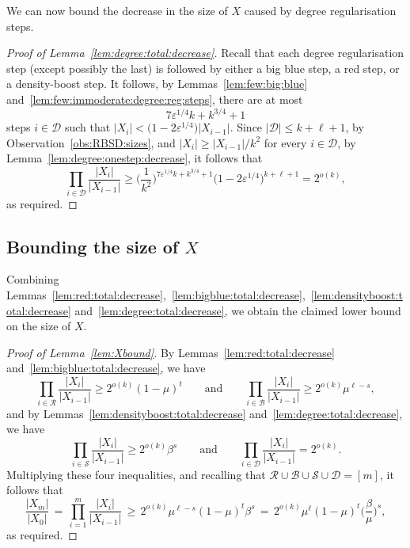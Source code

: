 \documentclass[12pt,reqno]{amsart}
\theoremstyle{definition}
\theoremstyle{remark}
\newcommand\cB{\mathcal{B}}
\def\cS{\mathcal{S}}
\newcommand\eps{\varepsilon}
\renewcommand{\le}{\leqslant}
\renewcommand{\ge}{\geqslant}
\def\eps{\varepsilon}
\def\cD{\mathcal{D}}
\def\cR{\mathcal{R}}
\def\cB{\mathcal{B}}
\begin{document}
We can now bound the decrease in the size of $X$ caused by degree regularisation steps. 

\begin{proof}[Proof of Lemma~\ref{lem:degree:total:decrease}]
Recall that each degree regularisation step (except possibly the last) is followed by either a big blue step, a red step, or a density-boost step. It follows, by Lemmas~\ref{lem:few:big:blue} and~\ref{lem:few:immoderate:degree:reg:steps}, there are at most 
$$7 \eps^{1/4} k + k^{3/4} + 1$$ 
steps $i \in \cD$ such that $|X_i| < \big( 1 - 2 \eps^{1/4} \big) |X_{i-1}|$. Since $|\cD| \le k+\ell+1$, by Observation~\ref{obs:RBSD:sizes}, and $|X_i| \ge |X_{i-1}| / k^2$ for every $i \in \cD$, by Lemma~\ref{lem:degree:onestep:decrease}, it follows that
$$\prod_{i \in \cD} \frac{|X_i|}{|X_{i-1}|} \ge \bigg( \frac{1}{k^2} \bigg)^{7 \eps^{1/4} k + k^{3/4} + 1} \big( 1 - 2 \eps^{1/4} \big)^{k+\ell+1} = 2^{o(k)},$$
as required. 
\end{proof}

\subsection{Bounding the size of $X$}\label{Xbound:proof}

Combining Lemmas~\ref{lem:red:total:decrease},~\ref{lem:bigblue:total:decrease},~\ref{lem:densityboost:total:decrease} and~\ref{lem:degree:total:decrease}, we obtain the claimed lower bound on the size of $X$. 

\begin{proof}[Proof of Lemma~\ref{lem:Xbound}]
By Lemmas~\ref{lem:red:total:decrease} and~\ref{lem:bigblue:total:decrease}, we have 
$$\prod_{i \in \cR} \frac{|X_i|}{|X_{i-1}|} \ge 2^{o(k)} (1 - \mu)^t \qquad \text{and} \qquad \prod_{i \in \cB} \frac{|X_i|}{|X_{i-1}|} \ge 2^{o(k)} \mu^{\ell - s},$$
and by Lemmas~\ref{lem:densityboost:total:decrease} and~\ref{lem:degree:total:decrease}, we have 
$$\prod_{i \in \cS} \frac{|X_i|}{|X_{i-1}|} \ge 2^{o(k)} \beta^s \qquad \text{and} \qquad \prod_{i \in \cD} \frac{|X_i|}{|X_{i-1}|} = 2^{o(k)}.$$
Multiplying these four inequalities, and recalling that %
$\cR \cup \cB \cup \cS \cup \cD = [m]$, it follows that
$$\frac{|X_m|}{|X_0|} \,=\, \prod_{i = 1}^m \frac{|X_i|}{|X_{i-1}|} \, \ge \, 2^{o(k)} \mu^{\ell-s} (1 - \mu)^t \beta^s \, = \, 2^{o(k)} \mu^\ell (1 - \mu)^t \bigg( \frac{\beta}{\mu} \bigg)^s,$$
as required. 
\end{proof}
\end{document}
